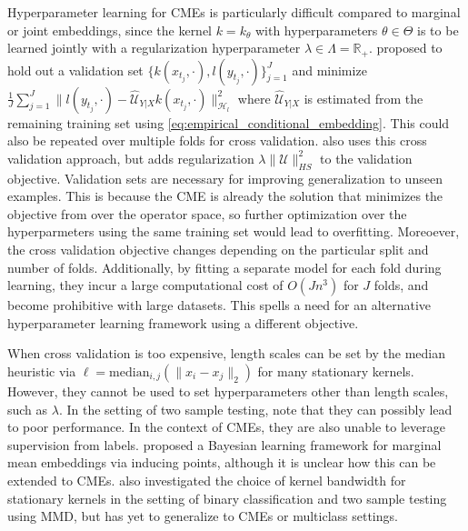 \documentclass[runningheads, envcountsame, a4paper]{llncs}
\begin{document}
			Hyperparameter learning for \glspl{CME} is particularly difficult compared to marginal or joint embeddings, since the kernel $k = k_{\theta}$ with hyperparameters $\theta \in \Theta$ is to be learned jointly with a regularization hyperparameter $\lambda \in \Lambda = \mathbb{R}_{+}$. \cite{grunewalder2012conditional} proposed to hold out a validation set $\{k(x_{t_{j}}, \cdot), l(y_{t_{j}}, \cdot)\}_{j = 1}^{J}$ and minimize $\frac{1}{J} \sum_{j = 1}^{J} \big\| l(y_{t_{j}}, \cdot) - \hat{\mathcal{U}}_{Y | X} k(x_{t_{j}}, \cdot) \big\|_{\mathcal{H}_{l}}^{2}$ where $\hat{\mathcal{U}}_{Y | X}$ is estimated from the remaining training set using \eqref{eq:empirical_conditional_embedding}. This could also be repeated over multiple folds for cross validation. \citet[p. 15]{song2013kernel} also uses this cross validation approach, but adds regularization $\lambda \| \mathcal{U} \|^{2}_{HS}$ to the validation objective. Validation sets are necessary for improving generalization to unseen examples. This is because the \gls{CME} is already the solution that minimizes the objective from \cite{grunewalder2012conditional} over the operator space, so further optimization over the hyperparmeters using the same training set would lead to overfitting. Moreoever, the cross validation objective changes depending on the particular split and number of folds. Additionally, by fitting a separate model for each fold during learning, they incur a large computational cost of $O(J n^{3})$ for $J$ folds, and become prohibitive with large datasets. This spells a need for an alternative hyperparameter learning framework using a different objective.
	
			When cross validation is too expensive, length scales can be set by the median heuristic \citep{muandet2016kernel} via $\ell = \mathrm{median}_{i, j}(\| x_{i} - x_{j} \|_{2})$ for many stationary kernels. However, they cannot be used to set hyperparameters other than length scales, such as $\lambda$. In the setting of two sample testing, \cite{gretton2012optimal} note that they can possibly lead to poor performance. In the context of \glspl{CME}, they are also unable to leverage supervision from labels. \cite{flaxman2016bayesian} proposed a Bayesian learning framework for marginal mean embeddings via inducing points, although it is unclear how this can be extended to \glspl{CME}. \cite{fukumizu2009kernel} also investigated the choice of kernel bandwidth for stationary kernels in the setting of binary classification and two sample testing using \gls{MMD}, but has yet to generalize to \glspl{CME} or multiclass settings.
	
\end{document}
